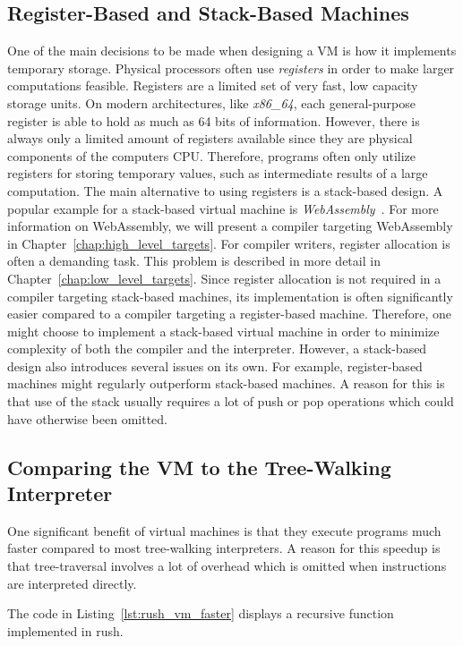 \subsection{Register-Based and Stack-Based Machines}

One of the main decisions to be made when designing a VM is how it implements temporary storage.
Physical processors often use \emph{registers} in order to make larger computations feasible.
Registers are a limited set of very fast, low capacity storage units.
On modern architectures, like \emph{x86\_64}, each general-purpose register is able to hold as much as 64 bits of information.
However, there is always only a limited amount of registers available since they are physical components of the computers CPU\@.
Therefore, programs often only utilize registers for storing temporary values, such as intermediate results of a large computation.
The main alternative to using registers is a stack-based design.
A popular example for a stack-based virtual machine is \emph{WebAssembly}~\cite[p.~44]{Sendil2022-fy}.
For more information on WebAssembly, we will present a compiler targeting WebAssembly in Chapter~\ref{chap:high_level_targets}.
For compiler writers, register allocation is often a demanding task.
This problem is described in more detail in Chapter~\ref{chap:low_level_targets}.
Since register allocation is not required in a compiler targeting stack-based machines, its implementation is often significantly easier compared to a compiler targeting a register-based machine.
Therefore, one might choose to implement a stack-based virtual machine in order to minimize complexity of both the compiler and the interpreter.
However, a stack-based design also introduces several issues on its own.
For example, register-based machines might regularly outperform stack-based machines.
A reason for this is that use of the stack usually requires a lot of push or pop operations which could have otherwise been omitted.

\subsection{Comparing the VM to the Tree-Walking Interpreter}
One significant benefit of virtual machines is that they execute programs much faster compared to most tree-walking interpreters.
A reason for this speedup is that tree-traversal involves a lot of overhead which is omitted when instructions are interpreted directly.

The code in Listing~\ref{lst:rush_vm_faster} displays a recursive function implemented in rush.

